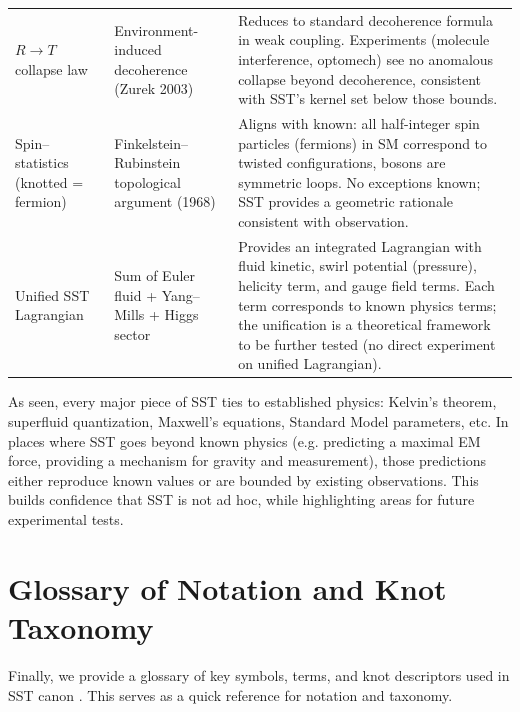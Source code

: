 \documentclass[10pt,reprint,aps,onecolumn,nofootinbib]{revtex4-2}
\begin{document}
\begin{table}[hbt!]
\begin{ruledtabular}
\begin{tabular}{|p{3.0cm} p{4.0cm} p{8.0cm}|}
				$R\to T$ collapse law & Environment-induced decoherence (Zurek 2003) & Reduces to standard decoherence formula in weak coupling. Experiments (molecule interference, optomech) see no anomalous collapse beyond decoherence, consistent with SST’s kernel set below those bounds. \\
				Spin–statistics (knotted = fermion) & Finkelstein–Rubinstein topological argument (1968) & Aligns with known: all half-integer spin particles (fermions) in SM correspond to twisted configurations, bosons are symmetric loops. No exceptions known; SST provides a geometric rationale consistent with observation. \\
				Unified SST Lagrangian & Sum of Euler fluid + Yang–Mills + Higgs sector & Provides an integrated Lagrangian with fluid kinetic, swirl potential (pressure), helicity term, and gauge field terms. Each term corresponds to known physics terms; the unification is a theoretical framework to be further tested (no direct experiment on unified Lagrangian). \\
			\end{tabular}
		\end{ruledtabular}
	\end{table}

	As seen, every major piece of SST ties to established physics: Kelvin’s theorem, superfluid quantization, Maxwell’s equations, Standard Model parameters, etc. In places where SST goes beyond known physics (e.g. predicting a maximal EM force, providing a mechanism for gravity and measurement), those predictions either reproduce known values or are bounded by existing observations. This builds confidence that SST is not ad hoc, while highlighting areas for future experimental tests.

	\section{Glossary of Notation and Knot Taxonomy}
	Finally, we provide a glossary of key symbols, terms, and knot descriptors used in SST canon \canonversion. This serves as a quick reference for notation and taxonomy.
\end{document}
